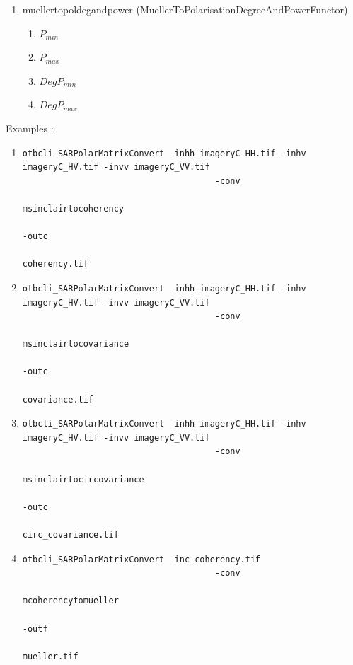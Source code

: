 \begin{enumerate}
 
\item muellertopoldegandpower (MuellerToPolarisationDegreeAndPowerFunctor)
\begin{enumerate}
\item $ P_{min} $ 
\item $ P_{max} $ 
\item $ DegP_{min} $ 
\item $ DegP_{max} $
\end{enumerate}

\end{enumerate}

Examples :

\begin{enumerate}
\item 
\begin{verbatim} 
otbcli_SARPolarMatrixConvert -inhh imageryC_HH.tif -inhv imageryC_HV.tif -invv imageryC_VV.tif
									  -conv
                                                                          msinclairtocoherency
                                                                          -outc
                                                                          coherency.tif 
\end{verbatim}
									  
\item 
\begin{verbatim} 
otbcli_SARPolarMatrixConvert -inhh imageryC_HH.tif -inhv imageryC_HV.tif -invv imageryC_VV.tif
									  -conv
                                                                          msinclairtocovariance
                                                                          -outc
                                                                          covariance.tif 
\end{verbatim}
									  
\item 
\begin{verbatim} 
otbcli_SARPolarMatrixConvert -inhh imageryC_HH.tif -inhv imageryC_HV.tif -invv imageryC_VV.tif
									  -conv
                                                                          msinclairtocircovariance
                                                                          -outc
                                                                          circ_covariance.tif 
\end{verbatim}
									  
\item 
\begin{verbatim} 
otbcli_SARPolarMatrixConvert -inc coherency.tif 
									  -conv
                                                                          mcoherencytomueller
                                                                          -outf
                                                                          mueller.tif 
\end{verbatim}
									  

\end{enumerate}
